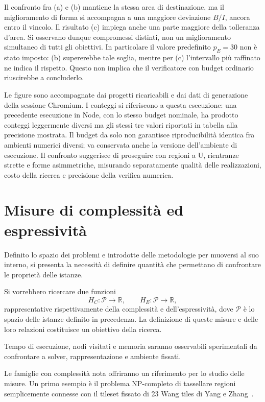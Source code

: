 \documentclass[11pt,a4paper]{article}
\begin{document}
Il confronto fra (a) e (b) mantiene la stessa area di destinazione, ma il miglioramento di forma si accompagna a una maggiore deviazione $B/I$, ancora entro il vincolo. Il risultato (c) impiega anche una parte maggiore della tolleranza d'area. Si osservano dunque compromessi distinti, non un miglioramento simultaneo di tutti gli obiettivi. In particolare il valore predefinito $p_E=30$ non è stato imposto: (b) supererebbe tale soglia, mentre per (c) l'intervallo più raffinato ne indica il rispetto. Questo non implica che il verificatore con budget ordinario riuscirebbe a concluderlo.

Le figure sono accompagnate dai progetti ricaricabili e dai dati di generazione della sessione Chromium. I conteggi si riferiscono a questa esecuzione: una precedente esecuzione in Node, con lo stesso budget nominale, ha prodotto conteggi leggermente diversi ma gli stessi tre valori riportati in tabella alla precisione mostrata. Il budget da solo non garantisce riproducibilità identica fra ambienti numerici diversi; va conservata anche la versione dell'ambiente di esecuzione. Il confronto suggerisce di proseguire con regioni a U, rientranze strette e forme asimmetriche, misurando separatamente qualità delle realizzazioni, costo della ricerca e precisione della verifica numerica.

\section{Misure di complessità ed espressività}

Definito lo spazio dei problemi e introdotte delle metodologie per muoversi al suo interno, si presenta la necessità di definire quantità che permettano di confrontare le proprietà delle istanze.

Si vorrebbero ricercare due funzioni
\[
H_C:\mathcal P\to\mathbb R,
\qquad H_E:\mathcal P\to\mathbb R,
\]
rappresentative rispettivamente della complessità e dell'espressività, dove $\mathcal P$ è lo spazio delle istanze definito in precedenza. La definizione di queste misure e delle loro relazioni costituisce un obiettivo della ricerca.

Tempo di esecuzione, nodi visitati e memoria saranno osservabili sperimentali da confrontare a solver, rappresentazione e ambiente fissati.

Le famiglie con complessità nota offriranno un riferimento per lo studio delle misure. Un primo esempio è il problema NP-completo di tassellare regioni semplicemente connesse con il tileset fissato di 23 Wang tiles di Yang e Zhang~\cite{yangzhang}.
\end{document}
